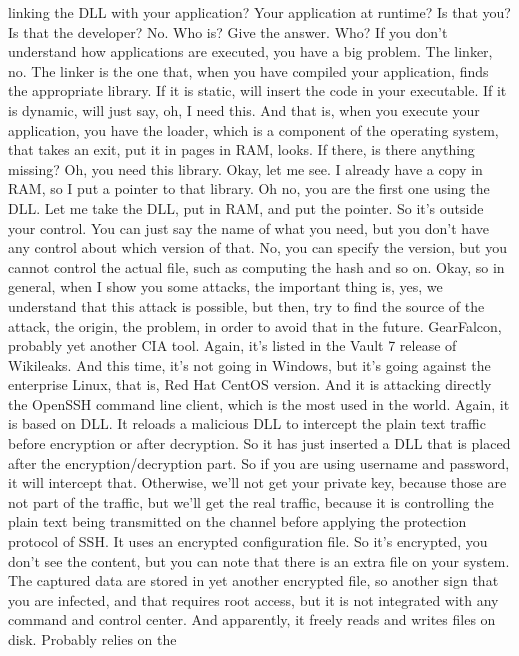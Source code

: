  linking the DLL with your application? Your application at runtime? Is that
 you? Is that the developer? No. Who is? Give the answer. Who? If you don't
 understand how applications are executed, you have a big problem. The linker,
 no. The linker is the one that, when you have compiled your application, finds
 the appropriate library. If it is static, will insert the code in your
 executable. If it is dynamic, will just say, oh, I need this. And that is,
 when you execute your application, you have the loader, which is a component
 of the operating system, that takes an exit, put it in pages in RAM, looks. If
 there, is there anything missing? Oh, you need this library. Okay, let me see.
 I already have a copy in RAM, so I put a pointer to that library. Oh no, you
 are the first one using the DLL. Let me take the DLL, put in RAM, and put the
 pointer. So it's outside your control. You can just say the name of what you
 need, but you don't have any control about which version of that. No, you can
 specify the version, but you cannot control the actual file, such as computing
 the hash and so on. Okay, so in general, when I show you some attacks, the
 important thing is, yes, we understand that this attack is possible, but then,
 try to find the source of the attack, the origin, the problem, in order to
 avoid that in the future. GearFalcon, probably yet another CIA tool. Again,
 it's listed in the Vault 7 release of Wikileaks. And this time, it's not going
 in Windows, but it's going against the enterprise Linux, that is, Red Hat
 CentOS version. And it is attacking directly the OpenSSH command line client,
 which is the most used in the world. Again, it is based on DLL. It reloads a
 malicious DLL to intercept the plain text traffic before encryption or after
 decryption. So it has just inserted a DLL that is placed after the
 encryption/decryption part. So if you are using username and password, it will
 intercept that. Otherwise, we'll not get your private key, because those are
 not part of the traffic, but we'll get the real traffic, because it is
 controlling the plain text being transmitted on the channel before applying
 the protection protocol of SSH. It uses an encrypted configuration file. So
 it's encrypted, you don't see the content, but you can note that there is an
 extra file on your system. The captured data are stored in yet another
 encrypted file, so another sign that you are infected, and that requires root
 access, but it is not integrated with any command and control center. And
 apparently, it freely reads and writes files on disk. Probably relies on the

